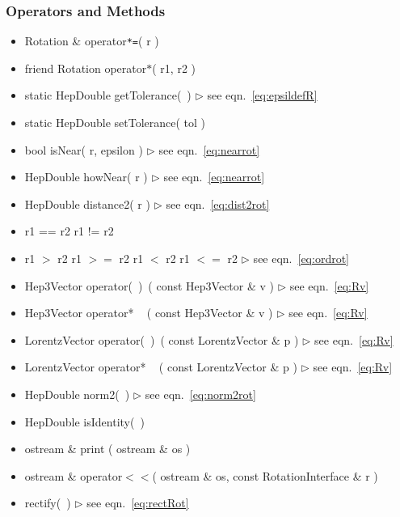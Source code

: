 \documentclass[twoside,12pt]{article}
\newcommand {\see}[1] {\hfill$\triangleright$ see eqn.~#1}
\newenvironment{shortlist}{%
\begin{itemize}
\setlength{\itemsep}{0pt}
\setlength{\parskip}{0pt}
}{%
\end{itemize}
}
\begin{document}
\subsubsection{Operators and Methods}

\begin{shortlist}
  \item Rotation \& operator\verb$*=$( r )
  \item friend Rotation operator$*$( r1, r2 )
\end{shortlist}

\begin{shortlist}
  \item static HepDouble getTolerance(~)	\see{\ref{eq:epsildefR}}
  \item static HepDouble setTolerance( tol )
  \item bool isNear( r, epsilon )		\see{\ref{eq:nearrot}}
  \item HepDouble howNear( r ) 			\see{\ref{eq:nearrot}}
  \item HepDouble distance2( r )		\see{\ref{eq:dist2rot}}
\end{shortlist}

\begin{shortlist}
  \item r1 == r2 \/\/\/ r1 != r2
  \item r1 $>$ r2 \/\/\/ r1 $>=$ r2 \/\/\/ r1 $<$ r2 \/\/\/ r1 $<=$ r2 
		\see{\ref{eq:ordrot}}
\end{shortlist}

\begin{shortlist}
  \item Hep3Vector operator(~)~( const Hep3Vector \& v ) \see{\ref{eq:Rv}}
  \item Hep3Vector operator* ~ ( const Hep3Vector \& v ) \see{\ref{eq:Rv}}
  \item LorentzVector operator(~)~( const LorentzVector \& p ) \see{\ref{eq:Rv}}
  \item LorentzVector operator* ~ ( const LorentzVector \& p ) \see{\ref{eq:Rv}}
\end{shortlist}


\begin{shortlist}
  \item HepDouble norm2(~)		\see{\ref{eq:norm2rot}}
  \item HepDouble isIdentity(~)		

  \item ostream \& print ( ostream \& os )
  \item ostream \& operator$<<$( ostream \& os, const RotationInterface \& r )
  \item rectify(~)				\see{\ref{eq:rectRot}}

\end{shortlist}
\end{document}
